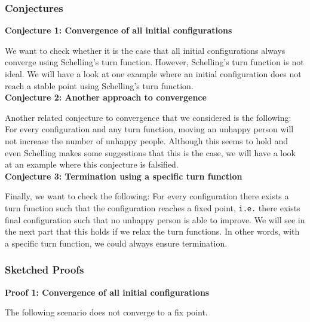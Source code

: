 \documentclass[../main.tex]{subfiles}
\begin{document}
\subsubsection{Conjectures }

\textbf{Conjecture 1: Convergence of all initial configurations}

We want to check whether it is the case that all initial configurations always converge using Schelling's turn function. However, Schelling's turn function is not ideal. We will have a look at one example where an initial configuration does not reach a stable point using Schelling's turn function.\\

\textbf{Conjecture 2: Another approach to convergence}

 Another related conjecture to convergence that we considered is the following: For every configuration and any turn function, moving an unhappy person will not increase the number of unhappy people. Although this seems to hold and even Schelling makes some suggestions that this is the case, we will have a look at an example where this conjecture is falsified.\\
 
\textbf{Conjecture 3: Termination using a specific turn function}

Finally, we want to check the following: For every configuration there exists a turn function such that the configuration reaches a fixed point, \verb|i.e.| there exists final configuration such that no unhappy person is able to improve. We will see in the next part that this holds if we relax the turn functions. In other words, with a specific turn function, we could always ensure termination.

    
\subsubsection{Sketched Proofs}

\textbf{Proof 1: Convergence of all initial configurations }

The following scenario does not converge to a fix point.
\end{document}
